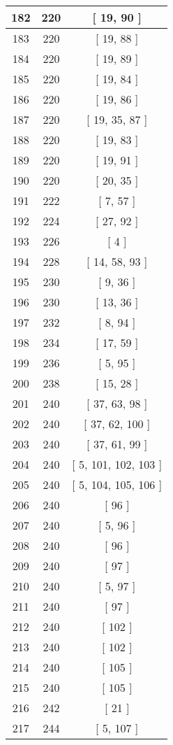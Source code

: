 \begin{center}
\begin{longtable}[H]{|| c c c ||}
\hline
182 & 220 & [ 19, 90 ] \\ 
\hline
183 & 220 & [ 19, 88 ] \\ 
\hline
184 & 220 & [ 19, 89 ] \\ 
\hline
185 & 220 & [ 19, 84 ] \\ 
\hline
186 & 220 & [ 19, 86 ] \\ 
\hline
187 & 220 & [ 19, 35, 87 ] \\ 
\hline
188 & 220 & [ 19, 83 ] \\ 
\hline
189 & 220 & [ 19, 91 ] \\ 
\hline
190 & 220 & [ 20, 35 ] \\ 
\hline
191 & 222 & [ 7, 57 ] \\ 
\hline
192 & 224 & [ 27, 92 ] \\ 
\hline
193 & 226 & [ 4 ] \\ 
\hline
194 & 228 & [ 14, 58, 93 ] \\ 
\hline
195 & 230 & [ 9, 36 ] \\ 
\hline
196 & 230 & [ 13, 36 ] \\ 
\hline
197 & 232 & [ 8, 94 ] \\ 
\hline
198 & 234 & [ 17, 59 ] \\ 
\hline
199 & 236 & [ 5, 95 ] \\ 
\hline
200 & 238 & [ 15, 28 ] \\ 
\hline
201 & 240 & [ 37, 63, 98 ] \\ 
\hline
202 & 240 & [ 37, 62, 100 ] \\ 
\hline
203 & 240 & [ 37, 61, 99 ] \\ 
\hline
204 & 240 & [ 5, 101, 102, 103 ] \\ 
\hline
205 & 240 & [ 5, 104, 105, 106 ] \\ 
\hline
206 & 240 & [ 96 ] \\ 
\hline
207 & 240 & [ 5, 96 ] \\ 
\hline
208 & 240 & [ 96 ] \\ 
\hline
209 & 240 & [ 97 ] \\ 
\hline
210 & 240 & [ 5, 97 ] \\ 
\hline
211 & 240 & [ 97 ] \\ 
\hline
212 & 240 & [ 102 ] \\ 
\hline
213 & 240 & [ 102 ] \\ 
\hline
214 & 240 & [ 105 ] \\ 
\hline
215 & 240 & [ 105 ] \\ 
\hline
216 & 242 & [ 21 ] \\ 
\hline
217 & 244 & [ 5, 107 ] \\ 

\end{longtable}
\end{center}
